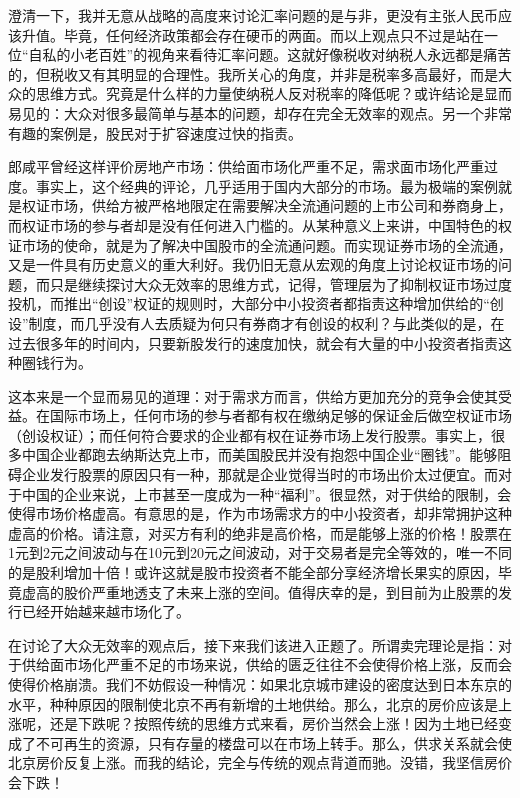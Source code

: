 澄清一下，我并无意从战略的高度来讨论汇率问题的是与非，更没有主张人民币应该升值。毕竟，任何经济政策都会存在硬币的两面。而以上观点只不过是站在一位“自私的小老百姓”的视角来看待汇率问题。这就好像税收对纳税人永远都是痛苦的，但税收又有其明显的合理性。我所关心的角度，并非是税率多高最好，而是大众的思维方式。究竟是什么样的力量使纳税人反对税率的降低呢？或许结论是显而易见的：大众对很多最简单与基本的问题，却存在完全无效率的观点。另一个非常有趣的案例是，股民对于扩容速度过快的指责。

郎咸平曾经这样评价房地产市场：供给面市场化严重不足，需求面市场化严重过度。事实上，这个经典的评论，几乎适用于国内大部分的市场。最为极端的案例就是权证市场，供给方被严格地限定在需要解决全流通问题的上市公司和券商身上，而权证市场的参与者却是没有任何进入门槛的。从某种意义上来讲，中国特色的权证市场的使命，就是为了解决中国股市的全流通问题。而实现证券市场的全流通，又是一件具有历史意义的重大利好。我仍旧无意从宏观的角度上讨论权证市场的问题，而只是继续探讨大众无效率的思维方式，记得，管理层为了抑制权证市场过度投机，而推出“创设”权证的规则时，大部分中小投资者都指责这种增加供给的“创设”制度，而几乎没有人去质疑为何只有券商才有创设的权利？与此类似的是，在过去很多年的时间内，只要新股发行的速度加快，就会有大量的中小投资者指责这种圈钱行为。

这本来是一个显而易见的道理：对于需求方而言，供给方更加充分的竞争会使其受益。在国际市场上，任何市场的参与者都有权在缴纳足够的保证金后做空权证市场（创设权证）；而任何符合要求的企业都有权在证券市场上发行股票。事实上，很多中国企业都跑去纳斯达克上市，而美国股民并没有抱怨中国企业“圈钱”。能够阻碍企业发行股票的原因只有一种，那就是企业觉得当时的市场出价太过便宜。而对于中国的企业来说，上市甚至一度成为一种“福利”。很显然，对于供给的限制，会使得市场价格虚高。有意思的是，作为市场需求方的中小投资者，却非常拥护这种虚高的价格。请注意，对买方有利的绝非是高价格，而是能够上涨的价格！股票在1元到2元之间波动与在10元到20元之间波动，对于交易者是完全等效的，唯一不同的是股利增加十倍！或许这就是股市投资者不能全部分享经济增长果实的原因，毕竟虚高的股价严重地透支了未来上涨的空间。值得庆幸的是，到目前为止股票的发行已经开始越来越市场化了。

在讨论了大众无效率的观点后，接下来我们该进入正题了。所谓卖完理论是指：对于供给面市场化严重不足的市场来说，供给的匮乏往往不会使得价格上涨，反而会使得价格崩溃。我们不妨假设一种情况：如果北京城市建设的密度达到日本东京的水平，种种原因的限制使北京不再有新增的土地供给。那么，北京的房价应该是上涨呢，还是下跌呢？按照传统的思维方式来看，房价当然会上涨！因为土地已经变成了不可再生的资源，只有存量的楼盘可以在市场上转手。那么，供求关系就会使北京房价反复上涨。而我的结论，完全与传统的观点背道而驰。没错，我坚信房价会下跌！

